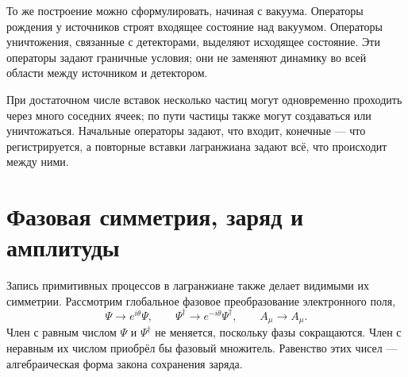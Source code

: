 То же построение можно сформулировать, начиная с вакуума. Операторы рождения у источников строят входящее состояние над вакуумом. Операторы уничтожения, связанные с детекторами, выделяют исходящее состояние. Эти операторы задают граничные условия; они не заменяют динамику во всей области между источником и детектором.

\begin{classroomqa}
\end{classroomqa}

При достаточном числе вставок несколько частиц могут одновременно проходить через много соседних ячеек; по пути частицы также могут создаваться или уничтожаться. Начальные операторы задают, что входит, конечные — что регистрируется, а повторные вставки лагранжиана задают всё, что происходит между ними.

\begin{classroomqa}
\end{classroomqa}

\section{Фазовая симметрия, заряд и амплитуды}

Запись примитивных процессов в лагранжиане также делает видимыми их симметрии. Рассмотрим глобальное фазовое преобразование электронного поля,
\begin{equation}
\Psi\longrightarrow e^{i\theta}\Psi,
\qquad
\Psi^\dagger\longrightarrow e^{-i\theta}\Psi^\dagger,
\qquad
A_\mu\longrightarrow A_\mu.
\end{equation}
Член с равным числом \(\Psi\) и \(\Psi^\dagger\) не меняется, поскольку фазы сокращаются. Член с неравным их числом приобрёл бы фазовый множитель. Равенство этих чисел — алгебраическая форма закона сохранения заряда.


